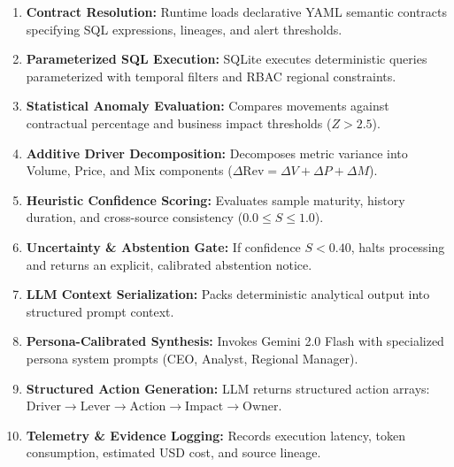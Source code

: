 \documentclass[11pt,a4paper]{article}
\begin{document}
\begin{tcolorbox}[colback=codebg,colframe=accent,title=\textbf{The 10-Step Pipeline Execution Flow}]
\begin{enumerate}[noitemsep]
    \item \textbf{Contract Resolution:} Runtime loads declarative YAML semantic contracts specifying SQL expressions, lineages, and alert thresholds.
    \item \textbf{Parameterized SQL Execution:} SQLite executes deterministic queries parameterized with temporal filters and RBAC regional constraints.
    \item \textbf{Statistical Anomaly Evaluation:} Compares movements against contractual percentage and business impact thresholds ($Z > 2.5$).
    \item \textbf{Additive Driver Decomposition:} Decomposes metric variance into Volume, Price, and Mix components ($\Delta\text{Rev} = \Delta V + \Delta P + \Delta M$).
    \item \textbf{Heuristic Confidence Scoring:} Evaluates sample maturity, history duration, and cross-source consistency ($0.0 \le S \le 1.0$).
    \item \textbf{Uncertainty \& Abstention Gate:} If confidence $S < 0.40$, halts processing and returns an explicit, calibrated abstention notice.
    \item \textbf{LLM Context Serialization:} Packs deterministic analytical output into structured prompt context.
    \item \textbf{Persona-Calibrated Synthesis:} Invokes Gemini 2.0 Flash with specialized persona system prompts (CEO, Analyst, Regional Manager).
    \item \textbf{Structured Action Generation:} LLM returns structured action arrays: $\text{Driver} \to \text{Lever} \to \text{Action} \to \text{Impact} \to \text{Owner}$.
    \item \textbf{Telemetry \& Evidence Logging:} Records execution latency, token consumption, estimated USD cost, and source lineage.
\end{enumerate}
\end{tcolorbox}
\end{document}
